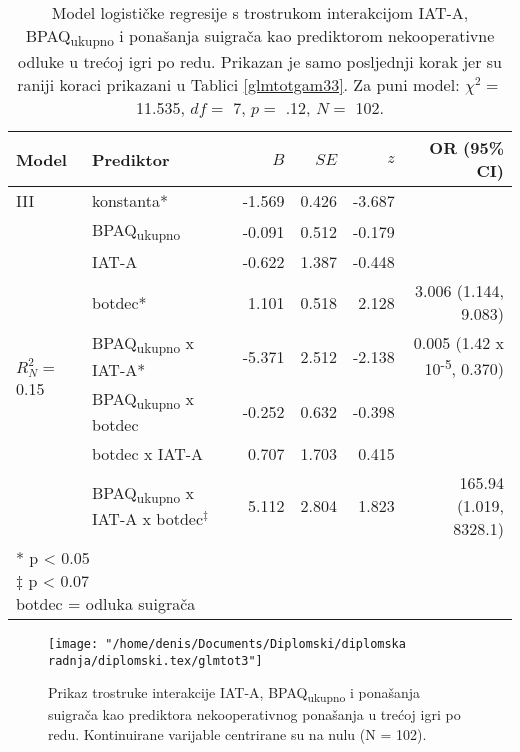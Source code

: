 \documentclass[a4paper, 12pt]{report}
\begin{document}
\begin{appendices}
\begin{table}
    \begin{center}
        \caption{\label{glmtotgam3} Model logističke regresije s trostrukom interakcijom IAT-A,
            BPAQ\textsubscript{ukupno} i ponašanja suigrača kao prediktorom
            nekooperativne odluke u trećoj igri po redu. Prikazan je samo posljednji korak
            jer su raniji koraci prikazani u Tablici \ref{glmtotgam33}. Za puni
            model: $\chi^2 =$
            11.535, $df =$ 7, $p =$ .12, $N =$ 102.}
        \hspace*{-0.5cm}\begin{tabular}{llrrrr}
        \toprule
        Model & Prediktor & $B$ & $SE$ & $z$ & OR (95\% CI)\\
        \midrule
        III & konstanta* & -1.569 & 0.426 & -3.687 &\\
        \multirow{7}{*}{$R^2_N =$ 0.15}
        &BPAQ\textsubscript{ukupno} & -0.091 & 0.512 & -0.179 & \\
        &IAT-A & -0.622 & 1.387 & -0.448 &\\
        &botdec* & 1.101 & 0.518 & 2.128 & 3.006 (1.144, 9.083)\\
        &BPAQ\textsubscript{ukupno} x IAT-A* & -5.371 & 2.512 & -2.138 & 0.005
        (1.42 x 10\textsuperscript{-5}, 0.370) \\
        &BPAQ\textsubscript{ukupno} x botdec & -0.252 & 0.632 & -0.398 &\\
        &botdec x IAT-A & 0.707 & 1.703 & 0.415 &\\
        & BPAQ\textsubscript{ukupno} x IAT-A x botdec$^\ddagger$ & 5.112 & 2.804
        & 1.823 & 165.94 (1.019, 8328.1) \\
        \bottomrule
        \multicolumn{5}{l}{
            \parbox{3cm}{\scriptsize \vspace{3pt} 
                * p < 0.05\\
                $\ddagger$  p < 0.07\\
                botdec = odluka suigrača
        }}
    \end{tabular}
\end{center}
\end{table}

\begin{figure}
    \begin{center}
        \caption{\label{glmtotgam3plot} Prikaz trostruke interakcije IAT-A,
            BPAQ\textsubscript{ukupno} i ponašanja suigrača kao prediktora
            nekooperativnog ponašanja u trećoj igri po redu. Kontinuirane
            varijable centrirane su na nulu (N = 102).}
        \texttt{[image: "/home/denis/Documents/Diplomski/diplomska
            radnja/diplomski.tex/glmtot3"]}
    \end{center}
\end{figure}


\end{appendices}
\end{document}
